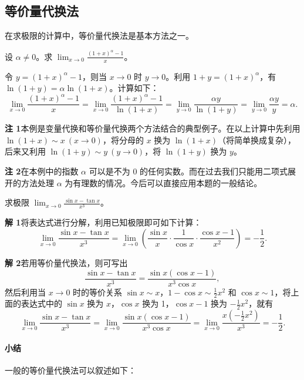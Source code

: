\subsection{等价量代换法}

在求极限的计算中，等价量代换法是基本方法之一。

\begin{xexample}[4.4.4]
设 $\alpha\ne0$。求 $\displaystyle\lim_{x\to0}\frac{(1+x)^\alpha-1}{x}$。
\end{xexample}
\begin{xsolution}
令 $y=(1+x)^\alpha-1$，则当 $x\to0$ 时 $y\to0$。利用 $1+y=(1+x)^\alpha$，有 $\ln(1+y)=\alpha\ln(1+x)$。计算如下：
\[
  \lim_{x\to0}\frac{(1+x)^\alpha-1}{x}
  =\lim_{x\to0}\frac{(1+x)^\alpha-1}{\ln(1+x)}
  =\lim_{y\to0}\frac{\alpha y}{\ln(1+y)}
  =\lim_{y\to0}\frac{\alpha y}{y}=\alpha.
\]
\end{xsolution}

\begin{xremark}
\textbf{注 1}\quad 本例是变量代换和等价量代换两个方法结合的典型例子。在以上计算中先利用 $\ln(1+x)\sim x\ (x\to0)$，将分母的 $x$ 换为 $\ln(1+x)$（将简单换成复杂），后来又利用 $\ln(1+y)\sim y\ (y\to0)$，将 $\ln(1+y)$ 换为 $y$。

\textbf{注 2}\quad 在本例中的指数 $\alpha$ 可以是不为 0 的任何实数。而在过去我们只能用二项式展开的方法处理 $\alpha$ 为有理数的情况。今后可以直接应用本题的一般结论。
\end{xremark}

\begin{xexample}[4.4.5]
求极限 $\displaystyle\lim_{x\to0}\frac{\sin x-\tan x}{x^3}$。
\end{xexample}
\begin{xsolution}
\textbf{解 1}\quad 将表达式进行分解，利用已知极限即可如下计算：
\[
  \lim_{x\to0}\frac{\sin x-\tan x}{x^3}
  =\lim_{x\to0}\left(\frac{\sin x}{x}\cdot\frac1{\cos x}\cdot\frac{\cos x-1}{x^2}\right)
  =-\frac12.
\]

\textbf{解 2}\quad 若用等价量代换法，则可写出
\[
  \frac{\sin x-\tan x}{x^3}=\frac{\sin x(\cos x-1)}{x^3\cos x},
\]
然后利用当 $x\to0$ 时的等价关系 $\sin x\sim x$，$1-\cos x\sim\frac12x^2$ 和 $\cos x\sim1$，将上面的表达式中的 $\sin x$ 换为 $x$，$\cos x$ 换为 1，$\cos x-1$ 换为 $-\frac12x^2$，就有
\[
  \lim_{x\to0}\frac{\sin x-\tan x}{x^3}
  =\lim_{x\to0}\frac{\sin x(\cos x-1)}{x^3\cos x}
  =\lim_{x\to0}\frac{x(-\frac12x^2)}{x^3}=-\frac12.
\]
\end{xsolution}

\paragraph{小结}
一般的等价量代换法可以叙述如下：

